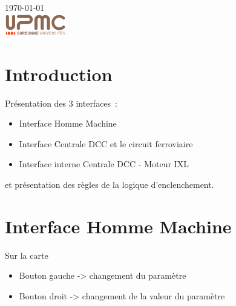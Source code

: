 \begin{titlepage}
{\large \today}\\[2cm] %


\includegraphics[width=0.2\textwidth]{logo.png}


\vfill %

\end{titlepage}




\section{Introduction}
\label{sec:introduction}
Présentation des 3 interfaces~:
\begin{itemize}
\item Interface Homme Machine
\item Interface Centrale DCC et le circuit ferroviaire
\item Interface interne Centrale DCC - Moteur IXL
\end{itemize}

et présentation des règles de la logique d'enclenchement.


\section{Interface Homme Machine}
\label{sec:int-dcc}
Sur la carte
\begin{itemize}
\item Bouton gauche -> changement du paramètre
\item Bouton droit  -> changement de la valeur du paramètre
\end{itemize}

